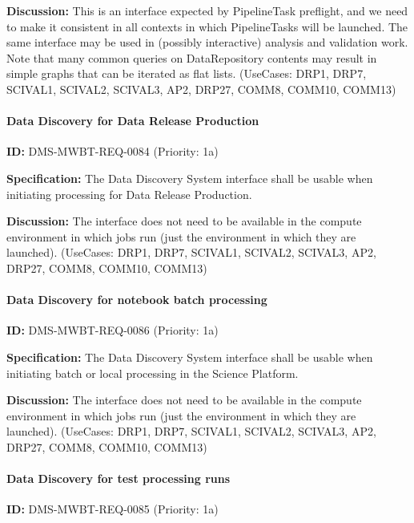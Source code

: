 \documentclass[SE,toc,lsstdraft]{lsstdoc}
\begin{document}
\textbf{Discussion:}
This is an interface expected by PipelineTask preflight, and we need to make it consistent in all contexts in which PipelineTasks will be launched. The same interface may be used in (possibly interactive) analysis and validation work. Note that many common queries on DataRepository contents may result in simple graphs that can be iterated as flat lists. (UseCases: DRP1, DRP7, SCIVAL1, SCIVAL2, SCIVAL3, AP2, DRP27, COMM8, COMM10, COMM13)

\paragraph{Data Discovery for Data Release Production}\hfill  %

\label{DMS-MWBT-REQ-0084}
\textbf{ID:} DMS-MWBT-REQ-0084 (Priority: 1a)

\textbf{Specification:}
The Data Discovery System interface shall be usable when initiating processing for Data Release Production.

\textbf{Discussion:}
The interface does not need to be available in the compute environment in which jobs run (just the environment in which they are launched). (UseCases: DRP1, DRP7, SCIVAL1, SCIVAL2, SCIVAL3, AP2, DRP27, COMM8, COMM10, COMM13)

\paragraph{Data Discovery for notebook batch processing}\hfill  %

\label{DMS-MWBT-REQ-0086}
\textbf{ID:} DMS-MWBT-REQ-0086 (Priority: 1a)

\textbf{Specification:}
The Data Discovery System interface shall be usable when initiating batch or local processing in the Science Platform.

\textbf{Discussion:}
The interface does not need to be available in the compute environment in which jobs run (just the environment in which they are launched). (UseCases: DRP1, DRP7, SCIVAL1, SCIVAL2, SCIVAL3, AP2, DRP27, COMM8, COMM10, COMM13)

\paragraph{Data Discovery for test processing runs}\hfill  %

\label{DMS-MWBT-REQ-0085}
\textbf{ID:} DMS-MWBT-REQ-0085 (Priority: 1a)
\end{document}
